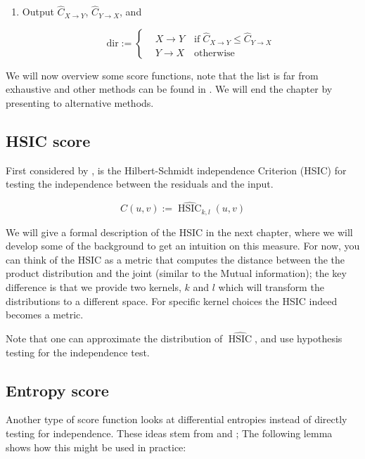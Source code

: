 \begin{algorithm}
\begin{enumerate}
        \item Output $\hat{C}_{X \rightarrow Y}$, $\hat{C}_{Y \rightarrow X}$, and
        
        \[ 
        \text{dir} :=  
         \begin{cases} 
            & X \rightarrow Y \quad \text{if} \; \hat{C}_{X \rightarrow Y} \leq \hat{C}_{Y \rightarrow X}\\
            & Y \rightarrow X \quad \text{otherwise}
         \end{cases}
        \]
        
    \end{enumerate}

  \label{alg:anm_general}
  \end{algorithm}


  We will now overview some score functions, note that the list is far from exhaustive and other methods can be found 
  in \cite{Mooij2016jmlr}. We will end the chapter by presenting to alternative methods. 

\subsection{HSIC score}

First considered by \cite{hoyer2009nonlinear}, is the Hilbert-Schmidt independence Criterion (HSIC) for
testing the independence between the residuals and the input. 

$$
  \hat{C}(u, v) := \widehat{\operatorname{HSIC}}_{k, l} (u, v)
$$

We will give a formal description of the HSIC in the next chapter, where we will develop some of the background 
to get an intuition on this measure. For now, you can think of the HSIC as a metric that computes the distance 
between the the product distribution and the joint (similar to the Mutual information); the key difference is that 
we provide two kernels, $k$ and $l$ which will transform the distributions to a different space. For specific 
kernel choices the HSIC indeed becomes a metric. 

Note that one can approximate the distribution of $\widehat{\operatorname{HSIC}}$, and use hypothesis testing 
for the independence test. 

\subsection{Entropy score}

Another type of score function looks at differential entropies instead of directly testing for independence.
These ideas stem from \cite{kpotufe2014consistency} and \cite{nowzohour2016score}; The following lemma shows how this might be used in practice:

